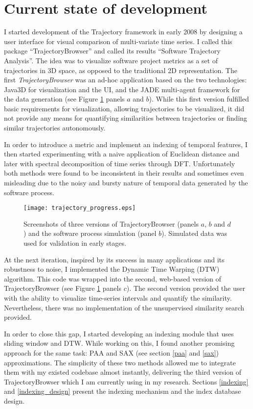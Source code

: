 \section{Current state of development}
I started development of the Trajectory framework in early 2008 by designing a user interface for visual comparison of multi-variate time series. I called this package ``TrajectoryBrowser'' and called its results ``Software Trajectory Analysis''. The idea was to visualize software project metrics as a set of trajectories in 3D space, as opposed to the traditional 2D representation. The first \textit{TrajectoryBrowser} was an ad-hoc application based on the two technologies: Java3D for visualization and the UI, and the JADE multi-agent framework \cite{citeulike:1230319} for the data generation (see Figure \ref{fig:trajectory_progress} panels $a$ and $b$). While this first version fulfilled basic requirements for visualization, allowing trajectories to be visualized, it did not provide any means for quantifying similarities between trajectories or finding similar trajectories autonomously.

In order to introduce a metric and implement an indexing of temporal features, I then started experimenting with a naive application of Euclidean distance and later with spectral decomposition of time series through DFT. Unfortunately both methods were found to be inconsistent in their results and sometimes even misleading due to the noisy and bursty nature of temporal data generated by the software process. 

\begin{figure}[tbp]
   \centering
   \texttt{[image: trajectory\_progress.eps]}
   \caption{Screenshots of three versions of TrajectoryBrowser (panels $a$, $b$ and $d$) and the software process simulation (panel $b$). Simulated data was used for validation in early stages.}
   \label{fig:trajectory_progress}
\end{figure}

At the next iteration, inspired by its success in many applications and its robustness to noise, I implemented the Dynamic Time Warping (DTW) algorithm. This code was wrapped into the second, web-based version of TrajectoryBrowser (see Figure \ref{fig:trajectory_progress} panels $c$). The second version provided the user with the ability to visualize time-series intervals and quantify the similarity. Nevertheless, there was no implementation of the unsupervised similarity search provided.

In order to close this gap, I started developing an indexing module that uses sliding window and DTW. While working on this, I found another promising approach for the same task: PAA and SAX (see section \ref{paa} and \ref{sax}) approximations. The simplicity of these two methods allowed me to integrate them with my existed codebase almost instantly, delivering the third version of TrajectoryBrowser which I am currently using in my research. Sections \ref{indexing} and \ref{indexing_design} present the indexing mechanism and the index database design. 

